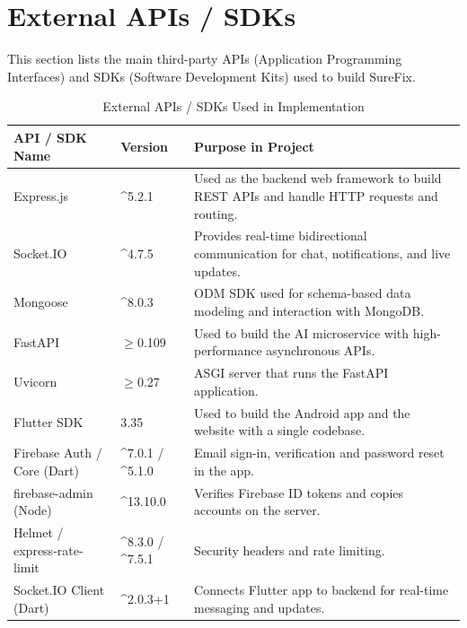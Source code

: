 \documentclass[A4paper,12pt]{report}
\theoremstyle{plain}
\theoremstyle{definition}
\theoremstyle{remark}
\numberwithin{equation}{section}
\begin{document}
\section{External APIs / SDKs}

This section lists the main third-party APIs (Application Programming Interfaces) and SDKs (Software Development Kits) used to build SureFix.

\begin{table}[H]
\centering
\caption{External APIs / SDKs Used in Implementation}
\begin{tabular}{|p{}|p{}|p{}|}
\hline
\textbf{API / SDK Name} & \textbf{Version} & \textbf{Purpose in Project} \\ \hline

Express.js & \textasciicircum{}5.2.1 & Used as the backend web framework to build REST APIs and handle HTTP requests and routing. \\ \hline

Socket.IO & \textasciicircum{}4.7.5 & Provides real-time bidirectional communication for chat, notifications, and live updates. \\ \hline

Mongoose & \textasciicircum{}8.0.3 & ODM SDK used for schema-based data modeling and interaction with MongoDB. \\ \hline

FastAPI & $\geq$0.109 & Used to build the AI microservice with high-performance asynchronous APIs. \\ \hline


Uvicorn & $\geq$0.27 & ASGI server that runs the FastAPI application. \\ \hline

Flutter SDK & 3.35 & Used to build the Android app and the website with a single codebase. \\ \hline

Firebase Auth / Core (Dart) & \textasciicircum{}7.0.1 / \textasciicircum{}5.1.0 & Email sign-in, verification and password reset in the app. \\ \hline

firebase-admin (Node) & \textasciicircum{}13.10.0 & Verifies Firebase ID tokens and copies accounts on the server. \\ \hline







Helmet / express-rate-limit & \textasciicircum{}8.3.0 / \textasciicircum{}7.5.1 & Security headers and rate limiting. \\ \hline



Socket.IO Client (Dart) & \textasciicircum{}2.0.3+1 & Connects Flutter app to backend for real-time messaging and updates. \\ \hline

\end{tabular}
\end{table}
\end{document}

